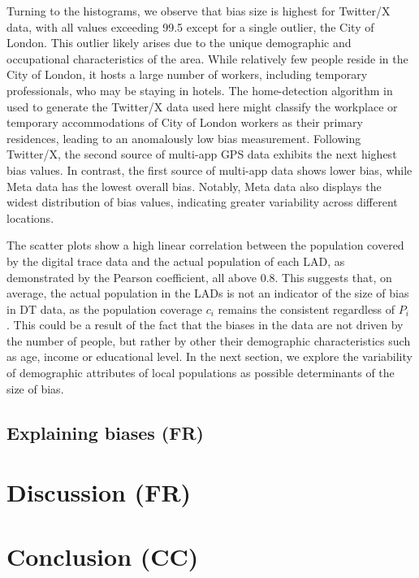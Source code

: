 \documentclass[]{rsos}%
\begin{document}
Turning to the histograms, we observe that bias size is highest for
Twitter/X data, with all values exceeding 99.5 except for a single
outlier, the City of London. This outlier likely arises due to the
unique demographic and occupational characteristics of the area. While
relatively few people reside in the City of London, it hosts a large
number of workers, including temporary professionals, who may be staying
in hotels. The home-detection algorithm in \citep{wang2022} used to generate
the Twitter/X data used here might classify the workplace or temporary
accommodations of City of London workers as their primary residences,
leading to an anomalously low bias measurement. Following Twitter/X, the
second source of multi-app GPS data exhibits the next highest bias
values. In contrast, the first source of multi-app data shows lower
bias, while Meta data has the lowest overall bias. Notably, Meta data
also displays the widest distribution of bias values, indicating greater
variability across different locations.

The scatter plots show a high linear correlation between the population
covered by the digital trace data and the actual population of each LAD,
as demonstrated by the Pearson coefficient, all above 0.8. This suggests
that, on average, the actual population in the LADs is not an indicator
of the size of bias in DT data, as the population coverage \(c_i\) remains
the consistent regardless of \(P_i\) . This could be a result of the fact
that the biases in the data are not driven by the number of people, but
rather by other their demographic characteristics such as age, income or
educational level. In the next section, we explore the variability of
demographic attributes of local populations as possible determinants of
the size of bias.

\hypertarget{explaining-biases-fr}{%
\subsection{Explaining biases (FR)}\label{explaining-biases-fr}}

\hypertarget{discussion-fr}{%
\section{Discussion (FR)}\label{discussion-fr}}

\hypertarget{conclusion-cc}{%
\section{Conclusion (CC)}\label{conclusion-cc}}
\end{document}
